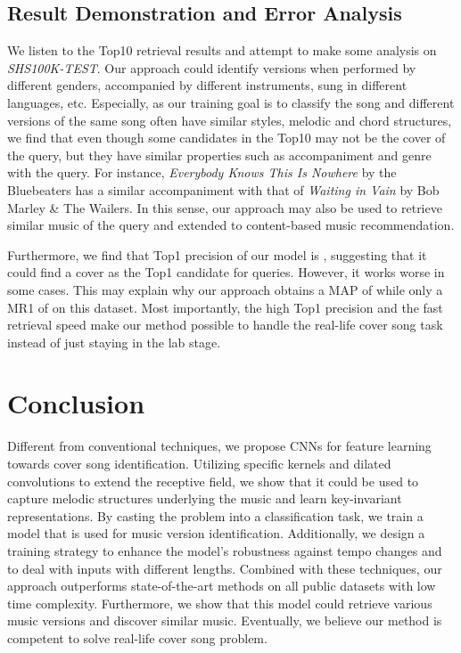 \documentclass{article}
\begin{document}
  
  
\subsection{Result Demonstration and Error Analysis}
We listen to the Top10 retrieval results and attempt to make some analysis on \textit{SHS100K-TEST}. Our approach could identify versions when performed by different genders, accompanied by different instruments, sung in different languages, etc. Especially, as our training goal is to classify the song and different versions of the same song often have similar styles, melodic and chord structures, we find that even though some candidates in the Top10 may not be the cover of the query, but they have similar properties such as accompaniment and genre with the query. For instance, \textit{Everybody Knows This Is Nowhere} by the Bluebeaters has a similar accompaniment with that of \textit{Waiting in Vain} by Bob Marley \& The Wailers. In this sense, our approach may also be used to retrieve similar music of the query and extended to content-based music recommendation.

Furthermore, we find that Top1 precision of our model is , suggesting that it could find a cover as the Top1 candidate for  queries. However, it works worse in some cases. This may explain why our approach obtains a MAP of  while only a MR1 of  on this dataset. Most importantly, the high Top1 precision and the fast retrieval speed make our method possible to handle the real-life cover song task instead of just staying in the lab stage. 



\section{Conclusion}
Different from conventional techniques, we propose CNNs for feature learning towards cover song identification. Utilizing specific kernels and dilated convolutions to extend the receptive field, we show that it could be used to capture melodic structures underlying the music and learn key-invariant representations. By casting the problem into a classification task, we train a model that is used for music version identification. Additionally, we design a training strategy to enhance the model's robustness against tempo changes and to deal with inputs with different lengths. Combined with these techniques, our approach outperforms state-of-the-art methods on all public datasets with low time complexity. Furthermore, we show that this model could retrieve various music versions and discover similar music. Eventually, we believe our method is competent to solve real-life cover song problem.
\vfill\pagebreak





\end{document}
